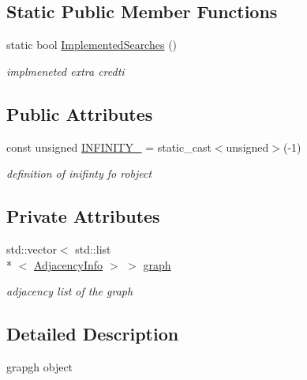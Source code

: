 \subsection*{Static Public Member Functions}
\begin{DoxyCompactItemize}
\item 
static bool \hyperlink{classALGraph_a29e4d51112b5817f8bac93f3b217d3e8}{Implemented\-Searches} ()
\begin{DoxyCompactList}\small\item\em implmeneted extra credti \end{DoxyCompactList}\end{DoxyCompactItemize}
\subsection*{Public Attributes}
\begin{DoxyCompactItemize}
\item 
\hypertarget{classALGraph_a8360670feeb2451c782272936b538efa}{const unsigned \hyperlink{classALGraph_a8360670feeb2451c782272936b538efa}{I\-N\-F\-I\-N\-I\-T\-Y\-\_\-} = static\-\_\-cast$<$unsigned$>$(-\/1)}\label{classALGraph_a8360670feeb2451c782272936b538efa}

\begin{DoxyCompactList}\small\item\em definition of inifinty fo robject \end{DoxyCompactList}\end{DoxyCompactItemize}
\subsection*{Private Attributes}
\begin{DoxyCompactItemize}
\item 
\hypertarget{classALGraph_a208283c21d926750ab605dcdfa55c0ee}{std\-::vector$<$ std\-::list\\*
$<$ \hyperlink{structAdjacencyInfo}{Adjacency\-Info} $>$ $>$ \hyperlink{classALGraph_a208283c21d926750ab605dcdfa55c0ee}{graph}}\label{classALGraph_a208283c21d926750ab605dcdfa55c0ee}

\begin{DoxyCompactList}\small\item\em adjacency list of the graph \end{DoxyCompactList}\end{DoxyCompactItemize}


\subsection{Detailed Description}
grapgh object 

